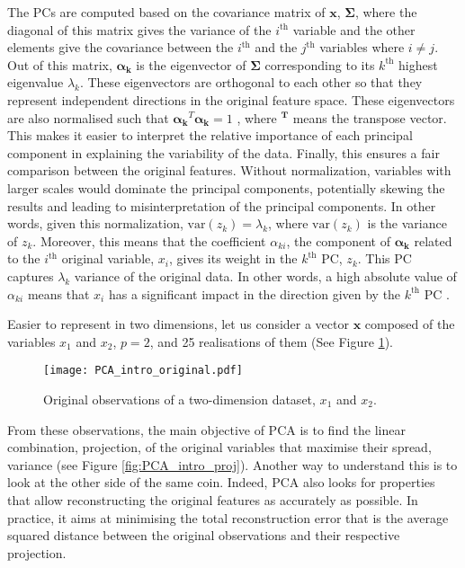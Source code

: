 The PCs are computed based on the covariance matrix of $\mathbf{x}$, $\mathbf{\Sigma}$, where the diagonal of this matrix gives the variance of the $i^{\text{th}}$ variable and the other elements give the covariance between the $i^{\text{th}}$ and the $j^{\text{th}}$ variables where $i\neq j$. Out of this matrix, $\mathbf{\alpha_k}$ is the eigenvector of $\mathbf{\Sigma}$ corresponding to its $k^{\text{th}}$ highest eigenvalue $\lambda_k$. These eigenvectors are orthogonal to each other so that they represent independent directions in the original feature space. These eigenvectors are also normalised such that $\mathbf{\alpha_k}^{T}\mathbf{\alpha_k}=1$ \cite{jolliffe2002principal}, where $\mathbf{^T}$ means the transpose vector. This makes it easier to interpret the relative importance of each principal component in explaining the variability of the data. Finally, this ensures a fair comparison between the original features. Without normalization, variables with larger scales would dominate the principal components, potentially skewing the results and leading to misinterpretation of the principal components. In other words, given this normalization, $\mathrm{var}\left(z_k\right)=\lambda_k$, where $\mathrm{var}\left(z_k\right)$ is the variance of $z_k$. Moreover, this means that the coefficient $\alpha_{ki}$, \ie the component of $ \mathbf{\alpha_k}$ related to the $i^{\text{th}}$ original variable, $x_i$,  gives its weight in the $k^{\text{th}}$ PC, \ie $z_k$. This PC captures $\lambda_k$ variance of the original data. In other words, a high absolute value of $\alpha_{ki}$ means that $x_i$ has a significant impact in the direction given by the $k^{\text{th}}$ PC \cite{zdybal2022advancing}. 

Easier to represent in two dimensions, let us consider a vector $\mathbf{x}$ composed of the variables $x_1$ and $x_2$, $p=2$, and 25 realisations of them (See Figure \ref{fig:PCA_intro_original}). 

\begin{figure}[!htbp]
\centering
\texttt{[image: PCA\_intro\_original.pdf]}
\caption{Original observations of a two-dimension dataset, $x_1$ and $x_2$.}
\label{fig:PCA_intro_original}
\end{figure}

From these observations, the main objective of \gls{PCA} is to find the linear combination, \ie projection, of the original variables that maximise their spread, \ie variance (see Figure \ref{fig:PCA_intro_proj}).  Another way to understand this is to look at the other side of the same coin. Indeed, \gls{PCA} also looks for properties that allow reconstructing the original features as accurately as possible. In practice, it aims at minimising the total reconstruction error that is the average squared distance between the original observations and their respective projection. 

